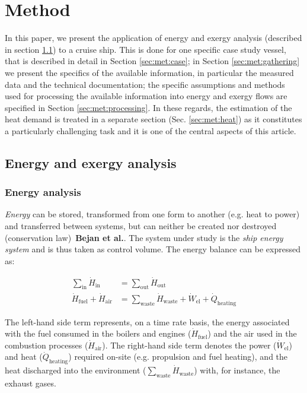 \documentclass[preprint,12pt]{elsarticle}
\begin{document}
\section{Method} \label{sec:method}

In this paper, we present the application of energy and exergy analysis (described in section \ref{sec:met:energyExergy}) to a cruise ship. This is done for one specific case study vessel, that is described in detail in Section \ref{sec:met:case}; in Section \ref{sec:met:gathering} we present the specifics of the available information, in particular the measured data and the technical documentation; the specific assumptions and methods used for processing the available information into  energy and exergy flows are specified in Section \ref{sec:met:processing}. In these regards, the estimation of the heat demand is treated in a separate section (Sec. \ref{sec:met:heat}) as it constitutes a particularly challenging task and it is one of the central aspects of this article. 

\subsection{Energy and exergy analysis} \label{sec:met:energyExergy}

\subsubsection{Energy analysis}

\emph{Energy} can be stored, transformed from one form to another (e.g. heat to power) and transferred between systems, but can neither be created nor destroyed (conservation law)~\textbf{Bejan et al.}. The system under study is the \emph{ship energy system} and is thus taken as control volume. The energy balance can be expressed as:

\begin{align}
	\sum_{\mathrm{in}} \dot{H}_{\mathrm{in}} &= \sum_{\mathrm{out}} \dot{H}_{\mathrm{out}} \\
	\dot{H}_{\mathrm{fuel}} + \dot{H}_{\mathrm{air}} &= \sum_{{\mathrm{waste}}}\dot{H}_{{\mathrm{waste}}}+\dot{W}_{\mathrm{el}}+\dot{Q}_{\mathrm{heating}}
\end{align}

The left-hand side term represents, on a time rate basis, the energy associated with the fuel consumed in the boilers and engines ($\dot{H}_{\mathrm{fuel}}$) and the air used in the combustion processes ($\dot{H}_{\mathrm{air}}$). The right-hand side term denotes the power ($\dot{W}_{\mathrm{el}}$) and heat ($\dot{Q}_{\mathrm{heating}}$) required on-site (e.g. propulsion and fuel heating), and the heat discharged into the environment ($\sum_{{\mathrm{waste}}}\dot{H}_{{\mathrm{waste}}}$) with, for instance, the exhaust gases.
\end{document}
